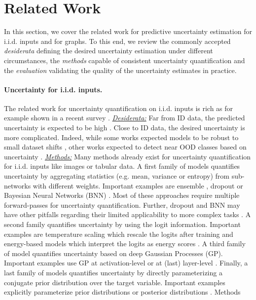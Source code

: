\section{Related Work}
\label{sec:related_work_009}

In this section, we cover the related work for predictive uncertainty estimation for i.i.d. inputs and for graphs. To this end, we review the commonly accepted \emph{desiderata} defining the desired uncertainty estimation under different circumstances, the \emph{methods} capable of consistent uncertainty quantification and the \emph{evaluation} validating the quality of the uncertainty estimates in practice.

\paragraph{Uncertainty for i.i.d. inputs.} The related work for uncertainty quantification on i.i.d. inputs is rich as for example shown in a recent survey \citep{review-uncertainty-dl}. \emph{\underline{Desiderata:}} Far from ID data, the predicted uncertainty is expected to be high \citep{provable-uncertainty, NatPN2021, bayesian-a-bit, sufficient-conditions-no-adversarial}. Close to ID data, the desired uncertainty is more complicated. Indeed, while some works expected models to be robust to small dataset shifts \citep{dataset-shift, stutz2020}, other works expected to detect near OOD classes based on uncertainty \citep{contrastive-ood, robustness-uncertainty-dirichlet, attack-detection}. \emph{\underline{Methods:}} Many methods already exist for uncertainty quantification for i.i.d. inputs like images or tabular data. A first family of models quantifies uncertainty by aggregating statistics (e.g. mean, variance or entropy) from sub-networks with different weights. Important examples are ensemble \citep{ensembles, batch-ensembles, hyper-ensembles, mimo-independent-subnetworks}, dropout \citep{Srivastava2014} or Bayesian Neural Networks (BNN) \citep{bayesian-networks, Depeweg2018, simple-baseline-uncertainty, liberty-depth-bnn, rank-1-bnn}. Most of these approaches require multiple forward-passes for uncertainty quantification. Further, dropout and BNN may have other pitfalls regarding their limited applicability to more complex tasks \citep{Osband2016, Hron2018, practical-bnn, expressiveness-bnn}. A second family quantifies uncertainty by using the logit information. Important examples are temperature scaling which rescale the logits after training \citep{calibration-network, Liang2017} and energy-based models which interpret the logits as energy scores \citep{Liu2020a, energy}. A third family of model quantifies uncertainty based on deep Gaussian Processes (GP). Important examples use GP at activation-level \cite{gp-uncertainty-activation} or at (last) layer-level \citep{uncertainty-distance-awareness, bayesian-a-bit, duq,uceloss}. Finally, a last family of models quantifies uncertainty by directly parameterizing a conjugate prior distribution over the target variable. Important examples explicitly parameterize prior distributions \citep{sensoy2018, distribution-distillation, PriorNetworks, reverse-kl, evidential-regression} or posterior distributions \citep{charpentier2020, NatPN2021}. Methods 